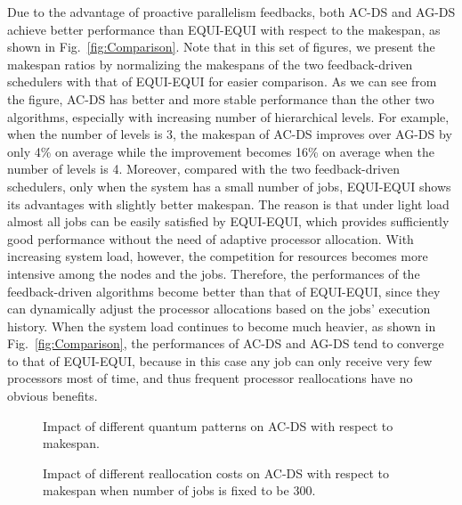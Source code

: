 \documentclass[10pt, a4paper]{article}
\newcommand{\figref}[1]         {Fig.~\ref{fig:#1}}
\begin{document}
Due to the advantage of proactive parallelism feedbacks, both AC-DS and AG-DS achieve better
performance than EQUI-EQUI with respect to the makespan, as shown in \figref{Comparison}. Note that
in this set of figures, we present the makespan ratios by normalizing the makespans of the two
feedback-driven schedulers with that of EQUI-EQUI for easier comparison. As we can see from the
figure, AC-DS has better and more stable performance than the other two algorithms, especially with
increasing number of hierarchical levels. For example, when the number of levels is 3, the makespan
of AC-DS improves over AG-DS by only 4\% on average while the improvement becomes 16\% on average
when the number of levels is 4. Moreover, compared with the two feedback-driven schedulers, only
when the system has a small number of jobs, EQUI-EQUI shows its advantages with slightly better
makespan. The reason is that under light load almost all jobs can be easily satisfied by EQUI-EQUI,
which provides sufficiently good performance without the need of adaptive processor allocation.
With increasing system load, however, the competition for resources becomes more intensive among
the nodes and the jobs. Therefore, the performances of the feedback-driven algorithms become better
than that of EQUI-EQUI, since they can dynamically adjust the processor allocations based on the
jobs' execution history. When the system load continues to become much heavier, as shown in
\figref{Comparison}, the performances of AC-DS and AG-DS tend to converge to that of EQUI-EQUI,
because in this case any job can only receive very few processors most of time, and thus frequent
processor reallocations have no obvious benefits.

\begin{figure}[t]
\centering
    \caption{Impact of different quantum patterns on AC-DS with respect to makespan.}
    \label{fig:DiffQuantum}
\end{figure}
\begin{figure*}[t]
\centering

    \caption{Impact of different reallocation costs on AC-DS with respect to makespan when number of jobs is fixed to be 300.}
    \label{fig:UtilizationAC}
\end{figure*}
\end{document}
